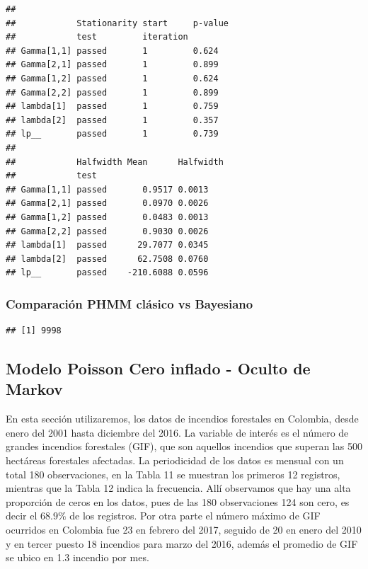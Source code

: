 \documentclass[a4paper]{article}\usepackage[]{graphicx}\usepackage[]{color}
\makeatletter
\newenvironment{kframe}{%
 \def\at@end@of@kframe{}%
 \ifinner\ifhmode%
  \def\at@end@of@kframe{\end{minipage}}%
  \begin{minipage}{\columnwidth}%
 \fi\fi%
 \def\FrameCommand##1{\hskip\@totalleftmargin \hskip-\fboxsep
 \colorbox{shadecolor}{##1}\hskip-\fboxsep
     \hskip-\linewidth \hskip-\@totalleftmargin \hskip\columnwidth}%
 \MakeFramed {\advance\hsize-\width
   \@totalleftmargin\z@ \linewidth\hsize
   \@setminipage}}%
 {\par\unskip\endMakeFramed%
 \at@end@of@kframe}
\newenvironment{knitrout}{}{} %
\makeatother
\begin{document}
\begin{knitrout}
\color{fgcolor}\begin{kframe}
\begin{verbatim}
##                                          
##            Stationarity start     p-value
##            test         iteration        
## Gamma[1,1] passed       1         0.624  
## Gamma[2,1] passed       1         0.899  
## Gamma[1,2] passed       1         0.624  
## Gamma[2,2] passed       1         0.899  
## lambda[1]  passed       1         0.759  
## lambda[2]  passed       1         0.357  
## lp__       passed       1         0.739  
##                                         
##            Halfwidth Mean      Halfwidth
##            test                         
## Gamma[1,1] passed       0.9517 0.0013   
## Gamma[2,1] passed       0.0970 0.0026   
## Gamma[1,2] passed       0.0483 0.0013   
## Gamma[2,2] passed       0.9030 0.0026   
## lambda[1]  passed      29.7077 0.0345   
## lambda[2]  passed      62.7508 0.0760   
## lp__       passed    -210.6088 0.0596
\end{verbatim}
\end{kframe}
\end{knitrout}

\subsubsection{Comparación PHMM clásico vs Bayesiano}

\begin{knitrout}
\color{fgcolor}\begin{kframe}
\begin{verbatim}
## [1] 9998
\end{verbatim}
\end{kframe}
\end{knitrout}

\subsection{Modelo Poisson Cero inflado - Oculto de Markov}



En esta sección utilizaremos, los datos de incendios forestales en Colombia, desde enero del 2001 hasta diciembre del 2016.  La variable de interés es el número de grandes incendios forestales (GIF), que son aquellos incendios que superan las 500 hectáreas forestales afectadas. La periodicidad de los datos es mensual con un total 180 observaciones, en la Tabla 11 se muestran los primeros 12 registros, mientras que la Tabla 12 indica la frecuencia. Allí observamos que hay una alta proporción de ceros en los datos, pues de las 180 observaciones 124 son cero, es decir el $68.9 \%$ de los registros. Por otra parte el número máximo de GIF ocurridos en Colombia fue 23 en febrero del 2017, seguido de 20 en enero del 2010 y en tercer puesto 18 incendios para marzo del 2016, además el promedio de GIF se ubico en 1.3  incendio por mes.
\end{document}
